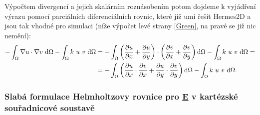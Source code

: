 \documentclass[12pt,a4paper,oneside]{article}
\numberwithin{equation}{section} %
\numberwithin{figure}{section} %
\numberwithin{table}{section} %
\newcommand{\faz}[1]{{\underline{#1}}} %
\begin{document}
Výpočtem divergencí a jejich skalárním roznásobením potom dojdeme k vyjádření výrazu pomocí parciálních diferenciálních rovnic, které již umí řešit Hermes2D a jsou tak vhodné pro simulaci (níže výpočet levé strany \ref{Green}, na pravé se již nic nemění):
\begin{equation}
\begin{split}
- \int _{\Omega} \nabla u \cdot \nabla v ~ \mathrm{d} \Omega - \int _{\Omega} k ~ u ~ v ~ \mathrm{d} \Omega &= - \int _{\Omega} \left( \frac{\partial u}{\partial x} + \frac{\partial u}{\partial y} \right) \cdot \left( \frac{\partial v}{\partial x} + \frac{\partial v}{\partial y} \right) \mathrm{d} \Omega - \int _{\Omega} k ~ u ~ v ~ \mathrm{d} \Omega =\\
&= - \int _{\Omega} \left( \frac{\partial u}{\partial x} \cdot \frac{\partial v}{\partial x} + \frac{\partial u}{\partial y} \cdot \frac{\partial v}{\partial y} \right) \mathrm{d} \Omega - \int _{\Omega} k ~ u ~ v ~ \mathrm{d} \Omega .
\end{split}
\end{equation}


\subsubsection{Slabá formulace Helmholtzovy rovnice pro \faz{E} v kartézské souřadnicové soustavě}
\end{document}
